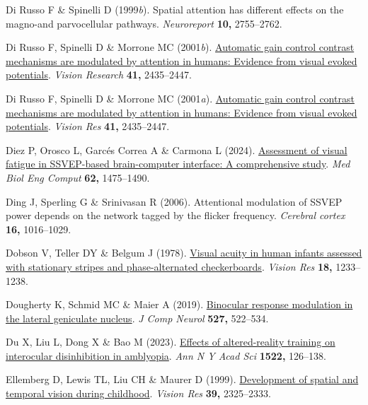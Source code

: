 \documentclass[
  letterpaper,
  DIV=11,
  numbers=noendperiod]{scrartcl}
\newlength{\cslhangindent}
\newenvironment{CSLReferences}[2] %
 {\begin{list}{}{%
  \setlength{\itemindent}{0pt}
  \setlength{\leftmargin}{0pt}
  \setlength{\parsep}{0pt}
  \ifodd #1
   \setlength{\leftmargin}{\cslhangindent}
   \setlength{\itemindent}{-1\cslhangindent}
  \fi
  \setlength{\itemsep}{#2\baselineskip}}}
 {\end{list}}
\begin{document}
\begin{CSLReferences}{1}{1}
Di Russo F \& Spinelli D (1999\emph{b}). Spatial attention has different
effects on the magno-and parvocellular pathways. \emph{Neuroreport}
\textbf{10,} 2755--2762.

Di Russo F, Spinelli D \& Morrone MC (2001\emph{b}).
\href{https://doi.org/10.1016/S0042-6989(01)00134-1}{Automatic gain
control contrast mechanisms are modulated by attention in humans:
Evidence from visual evoked potentials}. \emph{Vision Research}
\textbf{41,} 2435--2447.

Di Russo F, Spinelli D \& Morrone MC (2001\emph{a}).
\href{https://doi.org/10.1016/s0042-6989(01)00134-1}{Automatic gain
control contrast mechanisms are modulated by attention in humans:
Evidence from visual evoked potentials}. \emph{Vision Res} \textbf{41,}
2435--2447.

Diez P, Orosco L, Garcés Correa A \& Carmona L (2024).
\href{https://doi.org/10.1007/s11517-023-03000-z}{Assessment of visual
fatigue in SSVEP-based brain-computer interface: A comprehensive study}.
\emph{Med Biol Eng Comput} \textbf{62,} 1475--1490.

Ding J, Sperling G \& Srinivasan R (2006). Attentional modulation of
{SSVEP} power depends on the network tagged by the flicker frequency.
\emph{Cerebral cortex} \textbf{16,} 1016--1029.

Dobson V, Teller DY \& Belgum J (1978).
\href{https://doi.org/10.1016/0042-6989(78)90109-8}{Visual acuity in
human infants assessed with stationary stripes and phase-alternated
checkerboards}. \emph{Vision Res} \textbf{18,} 1233--1238.

Dougherty K, Schmid MC \& Maier A (2019).
\href{https://doi.org/10.1002/cne.24417}{Binocular response modulation
in the lateral geniculate nucleus}. \emph{J Comp Neurol} \textbf{527,}
522--534.

Du X, Liu L, Dong X \& Bao M (2023).
\href{https://doi.org/10.1111/nyas.14969}{Effects of altered-reality
training on interocular disinhibition in amblyopia}. \emph{Ann N Y Acad
Sci} \textbf{1522,} 126--138.

Ellemberg D, Lewis TL, Liu CH \& Maurer D (1999).
\href{https://doi.org/10.1016/s0042-6989(98)00280-6}{Development of
spatial and temporal vision during childhood}. \emph{Vision Res}
\textbf{39,} 2325--2333.


\end{CSLReferences}
\end{document}
